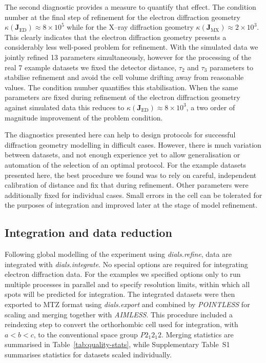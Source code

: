 \documentclass[preprint]{iucr}
\newcommand{\dialsrefine}{\emph{dials.refine}\xspace}
\newcommand{\dialsintegrate}{\emph{dials.integrate}\xspace}
\newcommand{\dialsexport}{\emph{dials.export}\xspace}
\newcommand{\pointless}{\emph{POINTLESS}\xspace}
\newcommand{\aimless}{\emph{AIMLESS}\xspace}
\newcommand{\mat}[1]{\mathbf{#1}}
\begin{document}
The second diagnostic provides a measure to quantify that effect. The condition
number at the final step of refinement for the electron diffraction geometry
$\kappa \left( \mat{J}_{\textrm{ED}} \right) \approx 8 \times 10^5$ while for
the X--ray diffraction geometry $\kappa \left( \mat{J}_{\textrm{MX}} \right)
\approx 2 \times 10^3$. This clearly indicates that the electron diffraction
geometry presents a considerably less well-posed problem for refinement. With
the simulated data we jointly refined 13 parameters simultaneously, however for
the processing of the real 7 example datasets we fixed the detector distance,
$\tau_2$ and $\tau_3$ parameters to stabilise refinement and avoid the cell
volume drifting away from reasonable values. The condition number quantifies
this stabilisation. When the same parameters are fixed during refinement of the
electron diffraction geometry against simulated data this reduces to $\kappa
\left( \mat{J}_{\textrm{ED}} \right) \approx 8 \times 10^3$, a two order of
magnitude improvement of the problem condition.

The diagnostics presented here can help to design protocols for successful
diffraction geometry modelling in difficult cases. However, there is much
variation between datasets, and not enough experience yet to allow
generalisation or automation of the selection of an optimal protocol. For the
example datasets presented here, the best procedure we found was to rely on
careful, independent calibration of distance and fix that during refinement.
Other parameters were additionally fixed for individual cases. Small errors in
the cell can be tolerated for the purposes of integration and improved later
at the stage of model refinement.

\subsection{Integration and data reduction}

Following global modelling of the experiment using \dialsrefine, data are
integrated with \dialsintegrate. No special options are required for integrating
electron diffraction data. For the examples we specified options only to
run multiple processes in parallel and to specify resolution limits, within
which all spots will be predicted for integration.
The integrated datasets were then exported to MTZ format using
\dialsexport and combined by \pointless \cite{Evans2006} for scaling and merging
together with \aimless \cite{Evans2013}. This procedure included a reindexing
step to convert the orthorhombic cell used for integration, with $a<b<c$, to the
conventional space group $P 2_1 2_1 2$. Merging statistics are summarised in
Table~\ref{tab:quality-stats}, while Supplementary Table~S1 summarises statistics
for datasets scaled individually.
\end{document}
